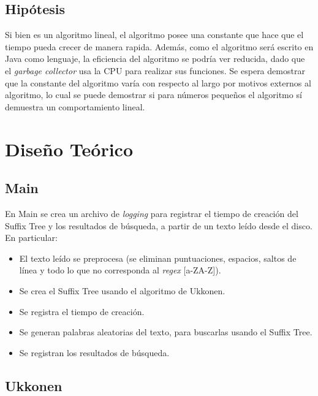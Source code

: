 \documentclass[letterpaper,10pt]{article}
\begin{document}
	\subsection{Hipótesis}

	Si bien es un algoritmo lineal, el algoritmo posee una constante que hace que el tiempo pueda crecer de manera rapida. Además, como el algoritmo será escrito en Java como lenguaje,
	la eficiencia del algoritmo se podría ver reducida, dado que el \textit{garbage collector} usa la CPU para realizar sus funciones. Se espera demostrar que la constante del algoritmo
	varía con respecto al largo por motivos externos al algoritmo, lo cual se puede demostrar si para números pequeños el algoritmo sí demuestra un comportamiento lineal.

	\newpage

	\section{Diseño Teórico}

	\subsection{Main}

	En Main se crea un archivo de \textit{logging} para registrar el tiempo de creación del Suffix Tree y los resultados de búsqueda, a partir de un texto leído desde el disco.
	En particular:
	\begin{itemize}
		\item El texto leído se preprocesa (se eliminan puntuaciones, espacios, saltos de línea y todo lo que no corresponda al \textit{regex} [a-ZA-Z]).
		\item Se crea el Suffix Tree usando el algoritmo de Ukkonen.
		\item Se registra el tiempo de creación.
		\item Se generan palabras aleatorias del texto, para buscarlas usando el Suffix Tree.
		\item Se registran los resultados de búsqueda.
	\end{itemize}

	\subsection{Ukkonen}
\end{document}
